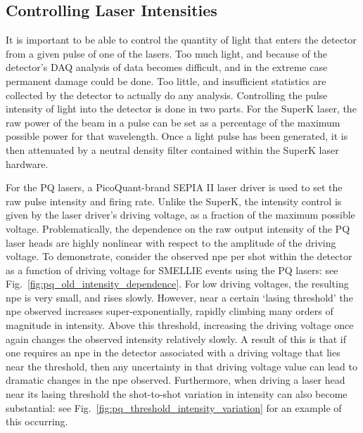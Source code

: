 \subsection{Controlling Laser Intensities}\label{sec:smellie_attenuators}
It is important to be able to control the quantity of light that enters the detector from a given pulse of one of the lasers. Too much light, and because of the detector's DAQ analysis of data becomes difficult, and in the extreme case permanent damage could be done. Too little, and insufficient statistics are collected by the detector to actually do any analysis. Controlling the pulse intensity of light into the detector is done in two parts. For the SuperK laser, the raw power of the beam in a pulse can be set as a percentage of the maximum possible power for that wavelength. Once a light pulse has been generated, it is then attenuated by a neutral density filter contained within the SuperK laser hardware.

For the PQ lasers, a PicoQuant-brand SEPIA II laser driver is used to set the raw pulse intensity and firing rate. Unlike the SuperK, the intensity control is given by the laser driver's driving voltage, as a fraction of the maximum possible voltage. Problematically, the dependence on the raw output intensity of the PQ laser heads are highly nonlinear with respect to the amplitude of the driving voltage. To demonstrate, consider the observed npe per shot within the detector as a function of driving voltage for SMELLIE events using the PQ lasers: see Fig.~\ref{fig:pq_old_intensity_dependence}. For low driving voltages, the resulting npe is very small, and rises slowly. However, near a certain `lasing threshold' the npe observed increases super-exponentially, rapidly climbing many orders of magnitude in intensity. Above this threshold, increasing the driving voltage once again changes the observed intensity relatively slowly. A result of this is that if one requires an npe in the detector associated with a driving voltage that lies near the threshold, then any uncertainty in that driving voltage value can lead to dramatic changes in the npe observed. Furthermore, when driving a laser head near its lasing threshold the shot-to-shot variation in intensity can also become substantial: see Fig.~\ref{fig:pq_threshold_intensity_variation} for an example of this occurring.

